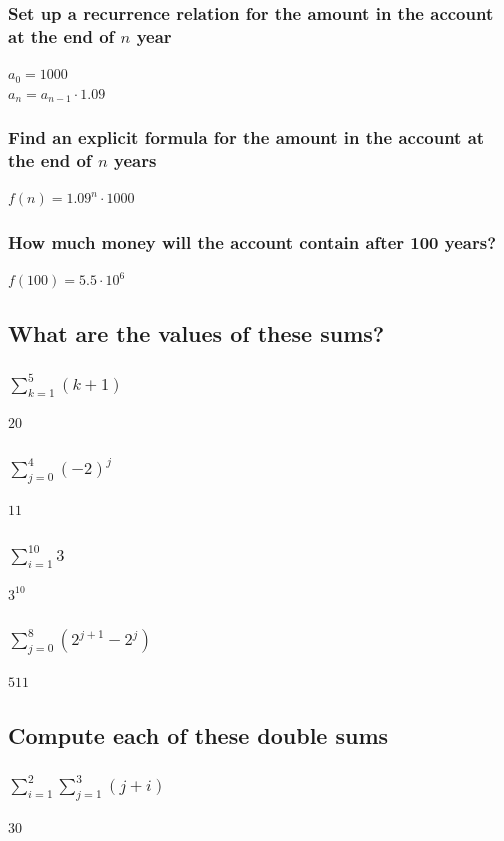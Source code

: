 \documentclass[12pt, a4paper]{report}
\begin{document}
					\subsubsection{Set up a recurrence relation for the amount in the account at the end of $n$ year}
						$a_0=1000$\\
						$a_n=a_{n-1}\cdot 1.09$
					\subsubsection{Find an explicit formula for the amount in the account at the end of $n$ years}
						$f(n)=1.09^n\cdot 1000$
					\subsubsection{How much money will the account contain after 100 years?}
						$f(100)=5.5\cdot 10^6$
				\setcounter{subsection}{28}
				\subsection{What are the values of these sums?}
				
					\subsubsection{$\sum\limits_{k=1}^5(k+1)$}
						$20$
					\subsubsection{$\sum\limits_{j=0}^4(-2)^j$}
						$11$
					\subsubsection{$\sum\limits_{i=1}^{10}3$}
						$3^10$
					\subsubsection{$\sum\limits_{j=0}^8(2^{j+1}-2^j)$}
						$511$
				\setcounter{subsection}{32}
				\subsection{Compute each of these double sums}
					
				\subsubsection{$\sum\limits_{i=1}^2\sum\limits_{j=1}^3(j+i)$}
					$30$
\end{document}
